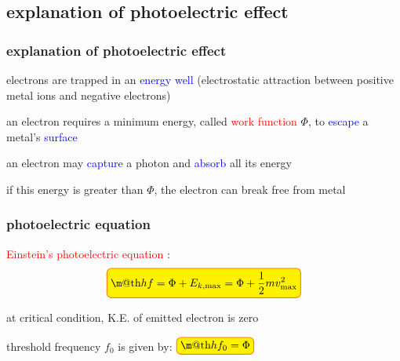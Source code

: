 \documentclass[12pt,xcolor=svgnames,handout]{beamer}
\makeatletter
\newcommand{\keypoint}[1]{%
   \textcolor{red}{#1}%
}
\newcommand{\tmax}{\text{max}}
\newcommand{\tightframetitle}[1]{ %
\frametitle{#1}\vspace{-.6\baselineskip}}
\renewcommand{\boxed}[1]{\textcolor{orange}{%
\tikz[baseline={([yshift=-1ex] current bounding box.center)}] \node [thick, rectangle, minimum width=1ex,rounded corners,fill=yellow, draw] {\normalcolor\m@th$\displaystyle#1$};}}
\makeatother
\begin{document}
\subsection{explanation of photoelectric effect}
\begin{frame}
\tightframetitle{explanation of photoelectric effect}

\begin{block}{}
electrons are trapped in an \textcolor{blue}{energy well} (electrostatic attraction between positive metal ions and negative electrons)
\end{block}

\begin{block}{}
an electron requires a minimum energy, called \keypoint{work function} $\Phi$, to \textcolor{blue}{escape} a metal's \textcolor{blue}{surface}
\end{block}

\begin{block}{}
an electron may \textcolor{blue}{capture} a photon and \textcolor{blue}{absorb} all its energy

if this energy is greater than $\Phi$, the electron can break free from metal
\end{block}

\end{frame}
\begin{frame}
\tightframetitle{photoelectric equation}

\begin{block}{}
\keypoint{Einstein's photoelectric equation}:
$$\boxed{hf = \Phi + E_{k,\tmax} = \Phi + \frac{1}{2}mv^2_\tmax}$$
\end{block}

\begin{block}{}
at critical condition, K.E. of emitted electron is zero
\end{block}

\begin{block}{}
threshold frequency $f_0$ is given by: $\boxed{hf_0 = \Phi}$
\end{block}

\end{frame}
\end{document}
